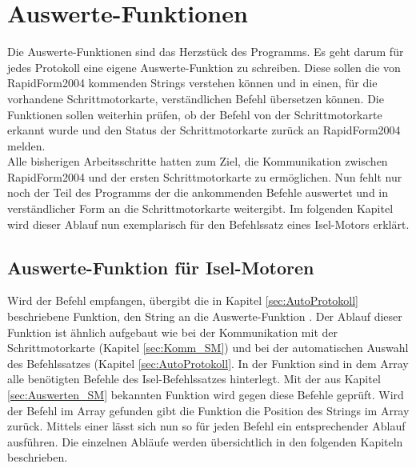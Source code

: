 \lstset{language=C, basicstyle=\footnotesize, showstringspaces=false, tabsize=8}


\lstset{language=C, basicstyle=\footnotesize, showstringspaces=false, tabsize=8}


\section{Auswerte-Funktionen}
\label{sec:Auswerten_RF}
Die Auswerte-Funktionen sind das Herzstück des Programms. Es geht darum für jedes Protokoll eine eigene Auswerte-Funktion zu schreiben. Diese sollen die von RapidForm2004 kommenden Strings verstehen können und in einen, für die vorhandene Schrittmotorkarte, verständlichen Befehl übersetzen können. Die Funktionen sollen weiterhin prüfen, ob der Befehl von der Schrittmotorkarte erkannt wurde und den Status der Schrittmotorkarte zurück an RapidForm2004 melden.\\
Alle bisherigen Arbeitsschritte hatten zum Ziel, die Kommunikation zwischen RapidForm2004 und der ersten Schrittmotorkarte zu ermöglichen. Nun fehlt nur noch der Teil des Programms der die ankommenden Befehle auswertet und in verständlicher Form an die Schrittmotorkarte weitergibt.
Im folgenden Kapitel wird dieser Ablauf nun exemplarisch für den Befehlssatz eines Isel-Motors erklärt.

\subsection{Auswerte-Funktion für Isel-Motoren}
Wird der Befehl  empfangen, übergibt die in Kapitel \ref{sec:AutoProtokoll} beschriebene Funktion, den String an die Auswerte-Funktion . Der Ablauf dieser Funktion ist ähnlich aufgebaut wie bei der Kommunikation mit der Schrittmotorkarte (Kapitel \ref{sec:Komm_SM}) und bei der automatischen Auswahl des Befehlssatzes (Kapitel \ref{sec:AutoProtokoll}. In der Funktion  sind in dem Array  alle benötigten Befehle des Isel-Befehlssatzes hinterlegt. Mit der aus Kapitel \ref{sec:Auswerten_SM} bekannten Funktion  wird   gegen diese Befehle geprüft. Wird der Befehl im Array gefunden gibt die Funktion  die Position des Strings im Array zurück. Mittels einer  lässt sich nun so für jeden Befehl ein entsprechender Ablauf ausführen. Die einzelnen Abläufe werden übersichtlich in den folgenden Kapiteln beschrieben.
\lstset{language=C, basicstyle=\footnotesize, showstringspaces=false, tabsize=8}


